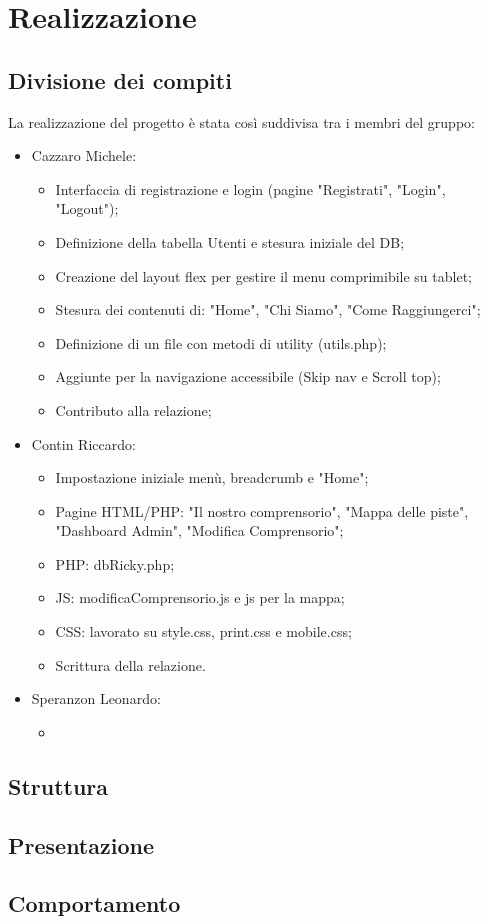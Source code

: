 \section{Realizzazione}

\subsection{Divisione dei compiti}

La realizzazione del progetto è stata così suddivisa tra i membri del gruppo:
\begin{itemize}
    \item Cazzaro Michele:
        \begin{itemize}
            \item Interfaccia di registrazione e login (pagine "Registrati", "Login", "Logout");
            \item Definizione della tabella Utenti e stesura iniziale del DB;
            \item Creazione del layout flex per gestire il menu comprimibile su tablet;
            \item Stesura dei contenuti di: "Home", "Chi Siamo", "Come Raggiungerci";
            \item Definizione di un file con metodi di utility (utils.php);
            \item Aggiunte per la navigazione accessibile (Skip nav e Scroll top);
            \item Contributo alla relazione;
        \end{itemize}
    \item Contin Riccardo:
        \begin{itemize}
            \item Impostazione iniziale menù, breadcrumb e "Home";
            \item Pagine HTML/PHP: "Il nostro comprensorio", "Mappa delle piste", "Dashboard Admin", "Modifica Comprensorio";
            \item PHP: dbRicky.php;
            \item JS: modificaComprensorio.js e js per la mappa;
            \item CSS: lavorato su style.css, print.css e mobile.css;
            \item Scrittura della relazione.
        \end{itemize}
    \item Speranzon Leonardo:
        \begin{itemize}
            \item 
        \end{itemize}
\end{itemize}

\subsection{Struttura}

\subsection{Presentazione}

\subsection{Comportamento}
